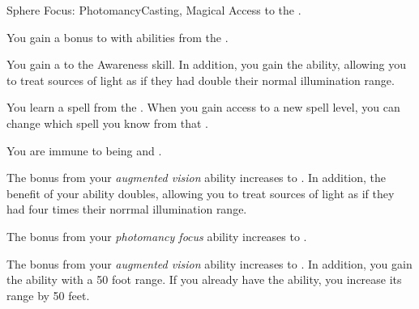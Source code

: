     \begin{feat}{Sphere Focus: Photomancy}{Casting, Magical}
        \featpre Access to the  .

         You gain a  bonus to  with abilities from the  .

         You gain a   to the Awareness skill.
        In addition, you gain the  ability, allowing you to treat sources of light as if they had double their normal illumination range.

         You learn a spell from the  .
        When you gain access to a new spell level, you can change which spell you know from that .

         You are immune to being  and .

         The bonus from your \textit{augmented vision} ability increases to .
        In addition, the benefit of your  ability doubles, allowing you to treat sources of light as if they had four times their norrmal illumination range.

         The bonus from your \textit{photomancy focus} ability increases to .

         The bonus from your \textit{augmented vision} ability increases to .
        In addition, you gain the  ability with a 50 foot range.
        If you already have the  ability, you increase its range by 50 feet.
    \end{feat}

